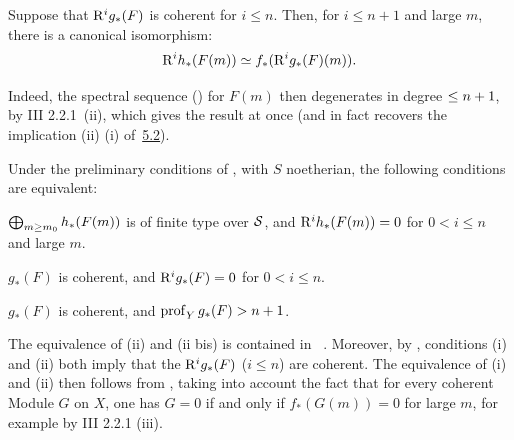 \begin{corollaire} \label{XII.5.4}
Suppose that $\R^ig_\ast(F)$ is coherent for $i\leq n$. Then, for $i\leq n+1$ and large $m$, there is a canonical isomorphism:
\[
\R^ih_\ast(F(m)) \simeq f_\ast(\R^ig_\ast(\sisi{G}{F})(m)).
\]
\end{corollaire}

Indeed, the spectral sequence () for $F(m)$ then degenerates in degree $\leq \sisi{n}{n+1}$, by \EGA III 2.2.1~(ii), which gives the result at once (and in fact recovers the implication (ii) \ALORS (i) of~\hyperref[XII.5.2]{5.2}).

\enlargethispage{1.2\baselineskip}%
\begin{corollaire} \label{XII.5.5}
Under the preliminary conditions of , with $S$ noetherian, the following conditions are equivalent:
\begin{enumeratei}
\item
$\sisi{\coprod}{\bigoplus}_{m\geq m_0}h_\ast(F(m)\sisi{}{)}$ is of finite type over $\sisi{S}{\Ss}$, and $\R^ih_\ast(F(m))=0$ for $0<i\leq n$ and large $m$.
\item
$g_\ast(F)$ is coherent, and $\R^ig_\ast(F)=0$ for $0<i\leq n$.
\item[\textup{(ii bis)}] $g_\ast(F)$ is coherent, and $\prof_Y g_\ast(F)>n+1$.
\end{enumeratei}
\end{corollaire}

The equivalence of (ii) and (ii bis) is contained in ~. Moreover, by , conditions (i) and (ii) both imply that the $\R^ig_\ast(F)$ ($i\leq n$) are coherent. The equivalence of (i) and (ii) then follows from , taking into account the fact that for every coherent Module $G$ on $X$, one has $G=0$ if and only if $f_\ast(G(m))=0$ for large $m$, for example by \EGA III 2.2.1 (iii).

